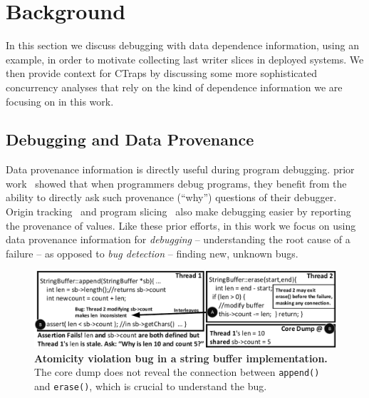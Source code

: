 \documentclass[preprint,9pt]{sigplanconf}
\newcommand{\ctraps}{CTraps\xspace}
\begin{document}
\section{Background}

In this section we discuss debugging with data dependence information, using an
example, in order to motivate collecting last writer slices in deployed
systems.  We then provide context for \ctraps by discussing some more
sophisticated concurrency analyses that rely on the kind of dependence
information we are focusing on in this work.


\subsection{Debugging and Data Provenance}

Data provenance information is directly useful during program debugging.  prior
work~\cite{whylinechi,whylineicse} showed that when programmers debug
programs, they benefit from the ability to directly ask such provenance
(``why'') questions of their debugger.  Origin tracking~\cite{badapples} and
program slicing~\cite{tipslicingsurvey} also make debugging easier by reporting
the provenance of values.  Like these prior efforts, in this work we focus on
using data provenance information for {\em debugging} -- understanding the root
cause of a failure -- as opposed to {\em bug detection} -- finding new, unknown
bugs.

\begin{figure}[h]
\centering
\includegraphics[width=\columnwidth]{figs/JDKStringBufferFail.pdf}
\caption{\label{fig:coreDumpFail}{\bf Atomicity violation bug in a string buffer implementation.} The core dump does not reveal the connection between {\tt append()} and {\tt erase()}, which is crucial to understand the bug.}
\end{figure}
\end{document}
